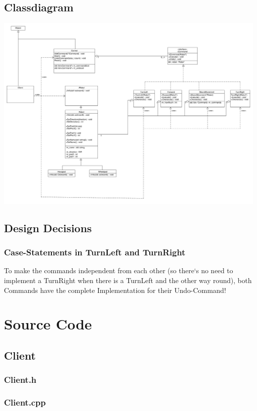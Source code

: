 \subsection{Classdiagram}
\includegraphics[scale=0.35, angle=90]{../ClassDiagram.pdf}

\subsection{Design Decisions}
\subsubsection{Case-Statements in TurnLeft and TurnRight}
To make the commands independent from each other (so there`s no need to implement a TurnRight when there is a TurnLeft and the other way round), both Commands have the complete Implementation for their Undo-Command!

\section{Source Code}

\subsection{Client}
\subsubsection{Client.h}
\subsubsection{Client.cpp}
\newpage

